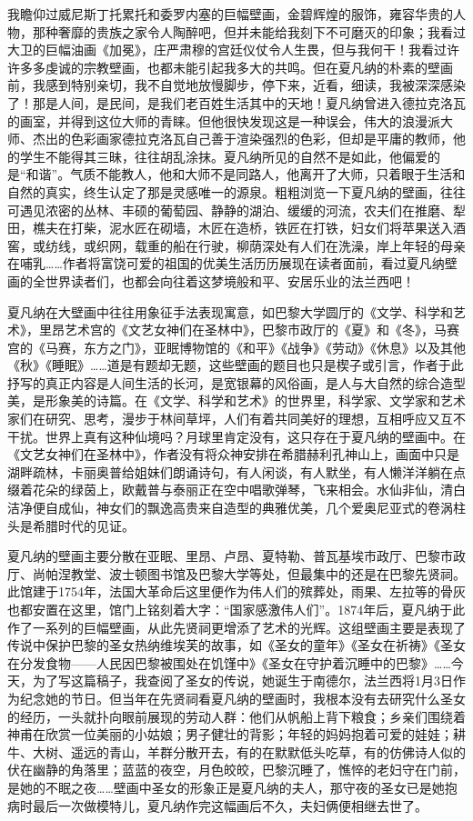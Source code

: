 \documentclass{article}
\begin{document}
我瞻仰过威尼斯丁托累托和委罗内塞的巨幅壁画，金碧辉煌的服饰，雍容华贵的人物，那种奢靡的贵族之家令人陶醉吧，但并未能给我刻下不可磨灭的印象；我看过大卫的巨幅油画《加冕》，庄严肃穆的宫廷仪仗令人生畏，但与我何干！我看过许许多多虔诚的宗教壁画，也都未能引起我多大的共鸣。但在夏凡纳的朴素的壁画前，我感到特别亲切，我不自觉地放慢脚步，停下来，近看，细读，我被深深感染了！那是人间，是民间，是我们老百姓生活其中的天地！夏凡纳曾进入德拉克洛瓦的画室，并得到这位大师的青睐。但他很快发现这是一种误会，伟大的浪漫派大师、杰出的色彩画家德拉克洛瓦自己善于渲染强烈的色彩，但却是平庸的教师，他的学生不能得其三昧，往往胡乱涂抹。夏凡纳所见的自然不是如此，他偏爱的是“和谐”。气质不能教人，他和大师不是同路人，他离开了大师，只着眼于生活和自然的真实，终生认定了那是灵感唯一的源泉。粗粗浏览一下夏凡纳的壁画，往往可遇见浓密的丛林、丰硕的葡萄园、静静的湖泊、缓缓的河流，农夫们在推磨、犁田，樵夫在打柴，泥水匠在砌墙，木匠在造桥，铁匠在打铁，妇女们将苹果送入酒窖，或纺线，或织网，载重的船在行驶，柳荫深处有人们在洗澡，岸上年轻的母亲在哺乳……作者将富饶可爱的祖国的优美生活历历展现在读者面前，看过夏凡纳壁画的全世界读者们，也都会向往着这梦境般和平、安居乐业的法兰西吧！

夏凡纳在大壁画中往往用象征手法表现寓意，如巴黎大学圆厅的《文学、科学和艺术》，里昂艺术宫的《文艺女神们在圣林中》，巴黎市政厅的《夏》和《冬》，马赛宫的《马赛，东方之门》，亚眠博物馆的《和平》《战争》《劳动》《休息》以及其他《秋》《睡眠》……道是有题却无题，这些壁画的题目也只是楔子或引言，作者于此抒写的真正内容是人间生活的长河，是宽银幕的风俗画，是人与大自然的综合造型美，是形象美的诗篇。在《文学、科学和艺术》的世界里，科学家、文学家和艺术家们在研究、思考，漫步于林间草坪，人们有着共同美好的理想，互相呼应又互不干扰。世界上真有这种仙境吗？月球里肯定没有，这只存在于夏凡纳的壁画中。在《文艺女神们在圣林中》，作者没有将众神安排在希腊赫利孔神山上，画面中只是湖畔疏林，卡丽奥普给姐妹们朗诵诗句，有人闲谈，有人默坐，有人懒洋洋躺在点缀着花朵的绿茵上，欧戴普与泰丽正在空中唱歌弹琴，飞来相会。水仙非仙，清白洁净便自成仙，神女们的飘逸高贵来自造型的典雅优美，几个爱奥尼亚式的卷涡柱头是希腊时代的见证。

夏凡纳的壁画主要分散在亚眠、里昂、卢昂、夏特勒、普瓦基埃市政厅、巴黎市政厅、尚帕涅教堂、波士顿图书馆及巴黎大学等处，但最集中的还是在巴黎先贤祠。此馆建于1754年，法国大革命后这里便作为伟人们的殡葬处，雨果、左拉等的骨灰也都安置在这里，馆门上铭刻着大字：“国家感激伟人们”。1874年后，夏凡纳于此作了一系列的巨幅壁画，从此先贤祠更增添了艺术的光辉。这组壁画主要是表现了传说中保护巴黎的圣女热纳维埃芙的故事，如《圣女的童年》《圣女在祈祷》《圣女在分发食物——人民因巴黎被围处在饥馑中》《圣女在守护着沉睡中的巴黎》……今天，为了写这篇稿子，我查阅了圣女的传说，她诞生于南德尔，法兰西将1月3日作为纪念她的节日。但当年在先贤祠看夏凡纳的壁画时，我根本没有去研究什么圣女的经历，一头就扑向眼前展现的劳动人群：他们从帆船上背下粮食；乡亲们围绕着神甫在欣赏一位美丽的小姑娘；男子健壮的背影；年轻的妈妈抱着可爱的娃娃；耕牛、大树、遥远的青山，羊群分散开去，有的在默默低头吃草，有的仿佛诗人似的伏在幽静的角落里；蓝蓝的夜空，月色皎皎，巴黎沉睡了，憔悴的老妇守在门前，是她的不眠之夜……壁画中圣女的形象正是夏凡纳的夫人，那守夜的圣女已是她抱病时最后一次做模特儿，夏凡纳作完这幅画后不久，夫妇俩便相继去世了。
\end{document}
